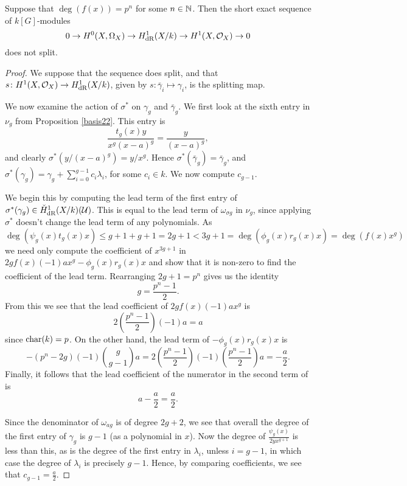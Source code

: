     \begin{thm}
    Suppose that $\deg(f(x)) = p^n $ for some $n \in {\mathbb N}$.
    Then the short exact sequence of $k[G]$-modules
        \[
        0 \rightarrow {H^0(X,\Omega_X)} \rightarrow H_{\text {dR}}^1(X/k) \rightarrow H^1(X,\mathcal{O}_X) \rightarrow 0
        \]
    does not split.
    \end{thm}
    \begin{proof}
    We suppose that the sequence does split, and that $s \colon H^1(X,\mathcal{O}_X) \rightarrow H_{\text {dR}}^1(X/k)$, given by $s \colon \bar\gamma_i \mapsto \gamma_i$, is the splitting map.
    
    We now examine the action of $\sigma^*$ on $\gamma_g$ and $\bar \gamma_g$.
    We first look at the sixth entry in $\nu_g$ from Proposition \ref{basis22}.
    This entry is
        \[
        \frac{t_g(x)y}{x^g(x-a)^g} = \frac{y}{(x-a)^g},
        \]
    and clearly $\sigma^*(y/(x-a)^g) = y/x^g$.
    Hence $\sigma^*(\bar\gamma_g) = \bar \gamma_g$, and $\sigma^*(\gamma_g) = \gamma_g + \sum_{i =0}^{g-1}c_i\lambda_i$, for some $c_i \in k$.
    We now compute $c_{g-1}$.
    
    We begin this by computing the lead term of the first entry of $\sigma^*(\gamma_g) \in \check{H}_{\text {dR}}^1(X/k)({\mathcal U})$.
    This is equal to the lead term of $\omega_{\sigma g}$ in $\nu_g$, since applying $\sigma^*$ doesn't change the lead term of any polynomials.
    As
        \[
        \deg(\psi_g(x)t_g(x)x) \leq g+1 + g+ 1 = 2g+1 < 3g+1 = \deg(\phi_g(x)r_g(x)x) = \deg(f(x)x^g)
        \]
    we need only compute the coefficient of $x^{3g+1}$ in $2gf(x)(-1)ax^g - \phi_g(x)r_g(x)x$ and show that it is non-zero to find the coefficient of the lead term.
    Rearranging $2g+1 = p^n $ gives us the identity
        \[
        g = \frac{p^n - 1}{2}.
        \]
    From this we see that the lead coefficient of $2gf(x)(-1)ax^g$ is 
        \[
        2\left( \frac{p^n-1}{2} \right) (-1)a = a
        \]
    since $\operatorname{char}(k) = p$.
    On the other hand, the lead term of $-\phi_g(x)r_g(x)x$ is
        \[
        -(p^n-2g)(-1)\binom{g}{g-1}a = 2\left(\frac{p^n -1 }{2}\right) (-1)\left( \frac{p^n - 1}{2} \right)a = -\frac{a}{2}.
        \]
    Finally, it follows that the lead coefficient of the numerator in the second term of is
        \[
        a - \frac{a}{2} = \frac{a}{2}.
        \]
    
    
    Since the denominator of $\omega_{a g}$ is of degree $2g+2$, we see that overall the degree of the first entry of $\gamma_g$ is $g-1$ (as a polynomial in $x$).
    Now the degree of $\frac{\psi_g(x)}{2yx^{g+1}}$ is less than this, as is the degree of the first entry in $\lambda_i$, unless $i=g-1$, in which case the degree of $\lambda_i$ is precisely $g-1$.
    Hence, by comparing coefficients, we see that $c_{g-1} = \frac{a}{2}$.
    

\end{proof}
